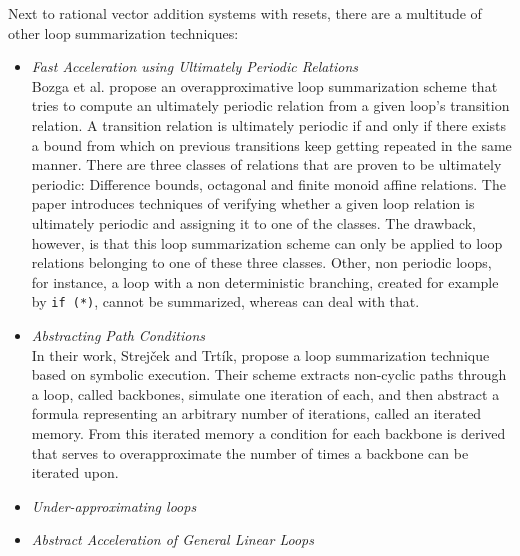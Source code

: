 
Next to rational vector addition systems with resets, there are a multitude of other loop summarization techniques:

\begin{itemize}
	\item \textsl{Fast Acceleration using Ultimately Periodic Relations}\cite{10.1007/978-3-642-14295-6_23}\\ Bozga et al. propose an overapproximative loop summarization scheme that tries to compute an ultimately periodic relation from a given loop's transition relation. A transition relation is ultimately periodic if and only if there exists a bound from which on previous transitions keep getting repeated in the same manner. There are three classes of relations that are proven to be ultimately periodic: Difference bounds, octagonal and finite monoid affine relations. The paper introduces techniques of verifying whether a given loop relation is ultimately periodic and assigning it to one of the classes. The drawback, however, is that this loop summarization scheme can only be applied to loop relations belonging to one of these three classes. Other, non periodic loops, for instance, a loop with a non deterministic branching, created for example by \texttt{if (*)}, cannot be summarized, whereas \qvasr can deal with that.
	
	\item \textsl{Abstracting Path Conditions}\cite{DBLP:conf/issta/StrejcekT12} \\
	In their work, Strejček and Trtík, propose a loop summarization technique based on symbolic execution. Their scheme extracts non-cyclic paths through a loop, called backbones, simulate one iteration of each, and then abstract a formula representing an arbitrary number of iterations, called an iterated memory. From this iterated memory a condition for each backbone is derived that serves to overapproximate the number of times a backbone can be iterated upon. 
	
	\item \textsl{Under-approximating loops}\cite{DBLP:conf/cav/KroeningLW13}
	
	\item \textsl{Abstract Acceleration of General Linear Loops}\cite{DBLP:conf/popl/JeannetSS14}
\end{itemize}
